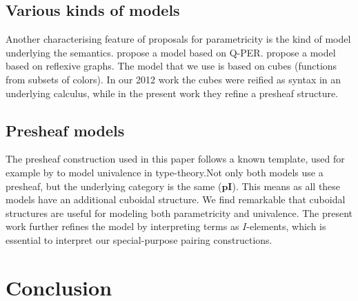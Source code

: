 \documentclass[english]{PaperTools/latex/lipics}
\def\pI{\ensuremath{\mathbf{pI}}}
\begin{document}
\subsection{Various kinds of models}
Another characterising feature of proposals for parametricity is the
kind of model underlying the
semantics.  propose a model
based on Q-PER.  propose a model based
on reflexive graphs. The model that we use is based on cubes
(functions from subsets of colors). In
our 2012 work the cubes were reified as syntax in
an underlying calculus, while in the present work they refine a presheaf structure.

\subsection{Presheaf models}

The presheaf construction used in this paper follows a known template,
used for example by \citet{bezem2014model,DBLP:journals/corr/Pitts14}
to model univalence in type-theory.Not only both models use a
presheaf, but the underlying category is the same ($\pI$). This means
as all these models have an additional cuboidal structure.  We find
remarkable that cuboidal structures are useful for modeling both
parametricity and univalence. The present work further refines the
model by interpreting terms as $I$-elements, which is essential to
interpret our special-purpose pairing constructions.

\section{Conclusion}



\end{document}
